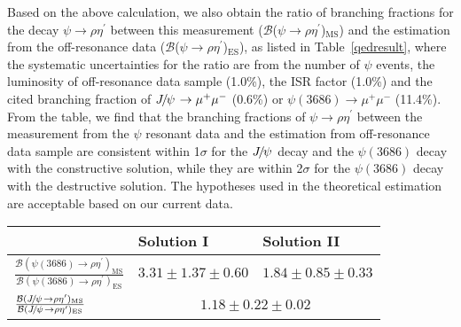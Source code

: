 \documentclass[twocolumn,showpacs,aps,prd]{revtex4-1}
\newcommand{\etap}{\eta^{\prime}}
\newcommand{\psip}{\psi(3686)}
\begin{document}
Based on the above calculation, we also obtain the ratio of branching fractions for the decay $\psi \to \rho \etap$ between this measurement ($\mathcal{B}$($\psi \to \rho \etap$)$_{\mathrm{MS}}$) and the estimation from the off-resonance data ($\mathcal{B}$($\psi \to \rho \etap$)$_{\mathrm{ES}}$), as listed in Table~\ref{qedresult}, where the systematic uncertainties for the ratio are from the number of $\psi$ events, the luminosity of off-resonance data sample (1.0\%), the ISR factor (1.0\%) and the cited branching fraction of ${J\mskip -3mu/\mskip -2mu\psi\mskip 2mu} \rightarrow \mu^{+}\mu^{-}$ (0.6\%) or $\psip \to \mu^{+}\mu^{-}$ (11.4\%). From the table, we find that the branching fractions of $\psi \to \rho \etap$ between the measurement from the $\psi$ resonant data and the estimation from off-resonance data sample are consistent within 1$\sigma$ for the ${J\mskip -3mu/\mskip -2mu\psi\mskip 2mu}$ decay and the $\psip$ decay with the constructive solution, while they are within 2$\sigma$ for the $\psip$ decay with the destructive solution. The hypotheses used in the theoretical estimation are acceptable based on our current data.


\begin{table*}[!bt]
  \begin{center}\normalsize
  \caption{The ratio of branching fractions of $\psi\to \rho \etap$ between our measurement (MS) and estimation (ES).}
  \label{qedresult}
  \setlength{\extrarowheight}{0.8ex}
  \renewcommand{\arraystretch}{0.8}
  \vspace{0.2cm}
  \begin{tabular}{p{5.0cm}m{4.7cm}<{\centering}m{4.7cm}<{\centering} }
  \hline\hline
  & Solution I & Solution II \\
  \hline
  \multirow{2}{*}{$\frac{\mathcal{B}(\psip \to \rho \etap)_{\text{MS}}}{\mathcal{B}(\psip \to \rho \etap)_{\text{ES}}}$} & \multirow{2}{*}{$3.31 \pm 1.37 \pm 0.60$}  & \multirow{2}{*}{$1.84 \pm 0.85 \pm 0.33$} \\
  &\\
  \multirow{2}{*}{$\frac{\mathcal{B}(\jpsi \to \rho \etap)_{\text{MS}}}{\mathcal{B}(\jpsi \to \rho \etap)_{\text{ES}}}$} & \multicolumn{2}{c}{\multirow{2}{*}{$1.18 \pm 0.22 \pm 0.02$}}\\
  &\\
  \hline\hline
  \end{tabular}
  \vspace{0.2cm}
  \end{center}
\end{table*}
\end{document}
